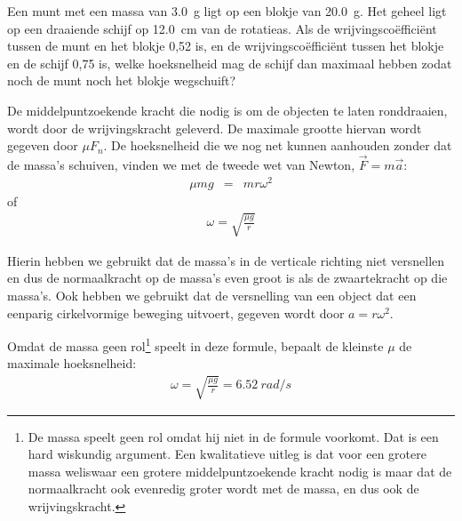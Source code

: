 
\begin{exercise}




 \begin{minipage}[t]{.67\linewidth}
Een munt met een massa van \SI{3,0}{g} ligt op een blokje van \SI{20,0}{g}. Het geheel ligt op een draaiende schijf op \SI{12,0}{cm} van de rotatieas. Als de wrijvingsco\"effici\"ent tussen de munt en het blokje 0,52 is, en de wrij\-vings\-co\"effici\"ent tussen het blokje en de schijf 0,75 is, welke hoeksnelheid mag de schijf dan maximaal hebben zodat noch de munt noch het blokje wegschuift?
\end{minipage}
\hfill
\begin{minipage}[t]{.3\linewidth}
\end{minipage}

\begin{oplossing}
	De middelpuntzoekende kracht die nodig is om de objecten te laten ronddraaien, wordt door de wrijvingskracht geleverd. De maximale grootte hiervan wordt gegeven door $\mu F_n$. De hoeksnelheid die we nog net kunnen aanhouden zonder dat de massa's schuiven, vinden we met de tweede wet van Newton, $\vec{F}=m\vec{a}$:
	\begin{eqnarray*}
		\mu mg&=&mr\omega^2
	\end{eqnarray*}
	of
		\begin{eqnarray*}
\omega=\sqrt{\frac{\mu g}{r}}
	\end{eqnarray*}
	
Hierin hebben we gebruikt dat de massa's in de verticale richting niet versnellen en dus de normaalkracht op de massa's even groot is als de zwaartekracht op die massa's. Ook hebben we gebruikt dat de versnelling van een object dat een eenparig cirkelvormige beweging uitvoert, gegeven wordt door $a=r\omega^2$.

Omdat de massa geen rol\footnote{De massa speelt geen rol omdat hij niet in de formule voorkomt. Dat is een hard wiskundig argument. Een kwalitatieve uitleg is dat voor een grotere massa weliswaar een grotere middelpuntzoekende kracht nodig is maar dat de normaalkracht ook evenredig groter wordt met de massa, en dus ook de wrijvingskracht.} speelt in deze formule, bepaalt de kleinste $\mu$ de maximale hoeksnelheid:
 \begin{eqnarray*}
\omega=\sqrt{\frac{\mu g}{r}}=\SI{6,52}{rad/s}
	\end{eqnarray*}
\end{oplossing}

\end{exercise}
